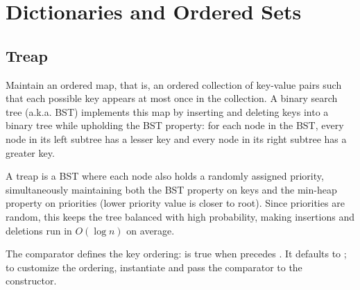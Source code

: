 \section{\texorpdfstring{Dictionaries and Ordered Sets}{2.4 Dictionaries and Ordered Sets}}
\setcounter{section}{4}
\setcounter{subsection}{0}
\subsection{Treap}
\label{sec:2.4.1}
Maintain an ordered map, that is, an ordered collection of key-value pairs such that each possible key appears at most once in the collection. A binary search tree (a.k.a. BST) implements this map by inserting and deleting keys into a binary tree while upholding the BST property: for each node in the BST, every node in its left subtree has a lesser key and every node in its right subtree has a greater key.

A treap is a BST where each node also holds a randomly assigned priority, simultaneously maintaining both the BST property on keys and the min-heap property on priorities (lower priority value is closer to root). Since priorities are random, this keeps the tree balanced with high probability, making insertions and deletions run in $O(\log n)$ on average.

The comparator  defines the key ordering:  is true when  precedes . It defaults to ; to customize the ordering, instantiate  and pass the comparator to the constructor.

